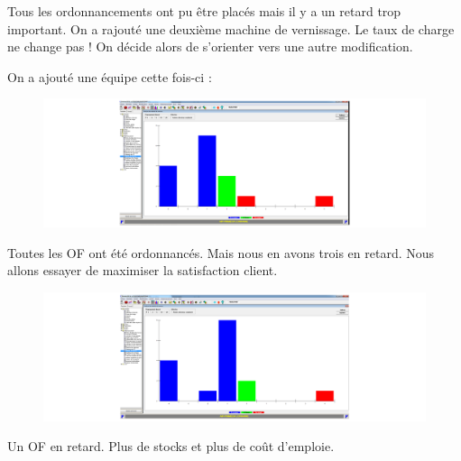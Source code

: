 \documentclass{scrreprt}
\begin{document}
Tous les ordonnancements ont pu être placés mais il y a un retard trop important. On a rajouté une deuxième machine de vernissage. Le taux de charge ne change pas ! On décide alors de s'orienter vers une autre modification. 

On a ajouté une équipe cette fois-ci : 

\begin{figure}
   \begin{minipage}[c]{.46\linewidth}
      \includegraphics[scale=0.3]{1equipeenplus.png}
   \end{minipage} \hfill
\end{figure}

Toutes les OF ont été ordonnancés. Mais nous en avons trois en retard. Nous allons essayer de maximiser la satisfaction client. 

\begin{figure}
   \begin{minipage}[c]{.46\linewidth}
      \includegraphics[scale=0.3]{2equipeenplus.png}
   \end{minipage} \hfill
\end{figure}


Un OF en retard.
Plus de stocks et plus de coût d'emploie. 
\end{document}
